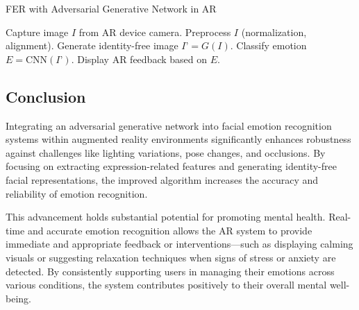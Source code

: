 \documentclass[lettersize,journal]{IEEEtran}
\begin{document}
\begin{algorithm}[htbp]
\caption{FER with Adversarial Generative Network in AR}
\label{alg:fer_agnet}
\begin{algorithmic}[1]
\State Capture image $I$ from AR device camera.
\State Preprocess $I$ (normalization, alignment).
\State Generate identity-free image $I’ = G(I)$.
\State Classify emotion $E = \text{CNN}(I’)$.
\State Display AR feedback based on $E$.
\EndWhile
\end{algorithmic}
\end{algorithm}

\subsection{Conclusion}

Integrating an adversarial generative network into facial emotion recognition systems within augmented reality environments significantly enhances robustness against challenges like lighting variations, pose changes, and occlusions. By focusing on extracting expression-related features and generating identity-free facial representations, the improved algorithm increases the accuracy and reliability of emotion recognition.

This advancement holds substantial potential for promoting mental health. Real-time and accurate emotion recognition allows the AR system to provide immediate and appropriate feedback or interventions—such as displaying calming visuals or suggesting relaxation techniques when signs of stress or anxiety are detected. By consistently supporting users in managing their emotions across various conditions, the system contributes positively to their overall mental well-being.
\end{document}
